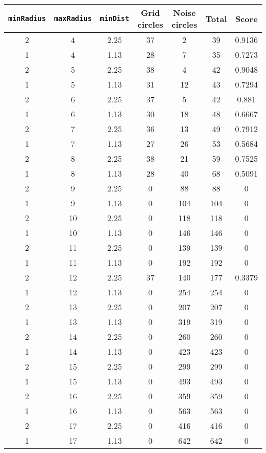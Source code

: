 \documentclass[letterpaper, 12pt]{article}
\begin{document}
\begin{longtable}{|c|c|c|c|c|c|c|}
\hline
\textbf{\texttt{minRadius}} & \textbf{\texttt{maxRadius}} & \textbf{\texttt{minDist}} & \textbf{Grid circles} & \textbf{Noise circles} & \textbf{Total} & \textbf{Score} \\
\hline
2 & 4 & 2.25 & 37 & 2 & 39 & 0.9136 \\
\hline
1 & 4 & 1.13 & 28 & 7 & 35 & 0.7273 \\
\hline
2 & 5 & 2.25 & 38 & 4 & 42 & 0.9048 \\
\hline
1 & 5 & 1.13 & 31 & 12 & 43 & 0.7294 \\
\hline
2 & 6 & 2.25 & 37 & 5 & 42 & 0.881 \\
\hline
1 & 6 & 1.13 & 30 & 18 & 48 & 0.6667 \\
\hline
2 & 7 & 2.25 & 36 & 13 & 49 & 0.7912 \\
\hline
1 & 7 & 1.13 & 27 & 26 & 53 & 0.5684 \\
\hline
2 & 8 & 2.25 & 38 & 21 & 59 & 0.7525 \\
\hline
1 & 8 & 1.13 & 28 & 40 & 68 & 0.5091 \\
\hline
2 & 9 & 2.25 & 0 & 88 & 88 & 0 \\
\hline
1 & 9 & 1.13 & 0 & 104 & 104 & 0 \\
\hline
2 & 10 & 2.25 & 0 & 118 & 118 & 0 \\
\hline
1 & 10 & 1.13 & 0 & 146 & 146 & 0 \\
\hline
2 & 11 & 2.25 & 0 & 139 & 139 & 0 \\
\hline
1 & 11 & 1.13 & 0 & 192 & 192 & 0 \\
\hline
2 & 12 & 2.25 & 37 & 140 & 177 & 0.3379 \\
\hline
1 & 12 & 1.13 & 0 & 254 & 254 & 0 \\
\hline
2 & 13 & 2.25 & 0 & 207 & 207 & 0 \\
\hline
1 & 13 & 1.13 & 0 & 319 & 319 & 0 \\
\hline
2 & 14 & 2.25 & 0 & 260 & 260 & 0 \\
\hline
1 & 14 & 1.13 & 0 & 423 & 423 & 0 \\
\hline
2 & 15 & 2.25 & 0 & 299 & 299 & 0 \\
\hline
1 & 15 & 1.13 & 0 & 493 & 493 & 0 \\
\hline
2 & 16 & 2.25 & 0 & 359 & 359 & 0 \\
\hline
1 & 16 & 1.13 & 0 & 563 & 563 & 0 \\
\hline
2 & 17 & 2.25 & 0 & 416 & 416 & 0 \\
\hline
1 & 17 & 1.13 & 0 & 642 & 642 & 0 \\

\end{longtable}
\end{document}
